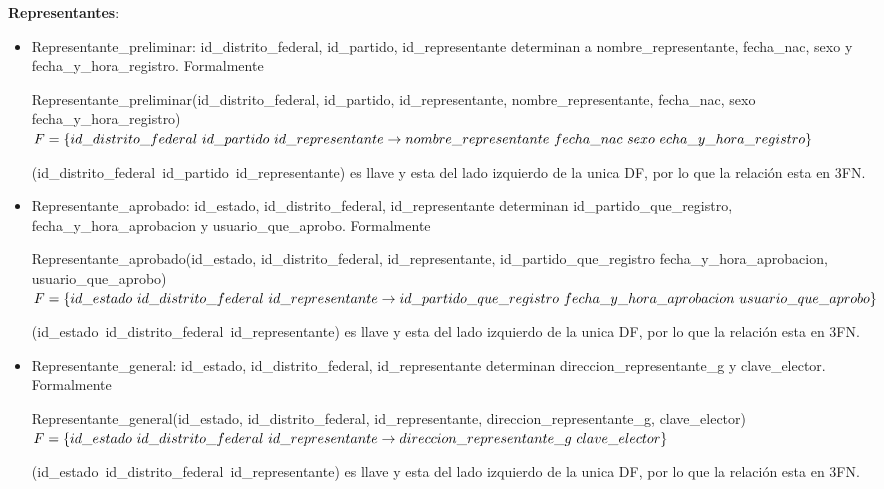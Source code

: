 \documentclass[a4paper,twoside,11pt]{article}
\begin{document}
\textbf{Representantes}:
\begin{itemize}
  \item Representante\_preliminar: id\_distrito\_federal, id\_partido, id\_representante determinan
        a nombre\_representante, fecha\_nac, sexo y fecha\_y\_hora\_registro. Formalmente

        Representante\_preliminar(id\_distrito\_federal, id\_partido, id\_representante,
        nombre\_representante, fecha\_nac, sexo fecha\_y\_hora\_registro)\\
        $F=\{id\_distrito\_federal~id\_partido~id\_representante\rightarrow\\
        nombre\_representante~fecha\_nac~sexo~echa\_y\_hora\_registro\}$

        (id\_distrito\_federal~id\_partido~id\_representante) es llave y esta del lado izquierdo de la unica DF,
        por lo que la relación esta en 3FN.

  \item Representante\_aprobado: id\_estado, id\_distrito\_federal, id\_representante determinan
        id\_partido\_que\_registro, fecha\_y\_hora\_aprobacion y usuario\_que\_aprobo. Formalmente

        Representante\_aprobado(id\_estado, id\_distrito\_federal, id\_representante, id\_partido\_que\_registro
        fecha\_y\_hora\_aprobacion, usuario\_que\_aprobo)\\
        $F=\{id\_estado~id\_distrito\_federal~id\_representante\rightarrow\\
        id\_partido\_que\_registro~fecha\_y\_hora\_aprobacion~usuario\_que\_aprobo\}$

        (id\_estado~id\_distrito\_federal~id\_representante) es llave y esta del lado izquierdo de la unica DF,
        por lo que la relación esta en 3FN.

  \item Representante\_general: id\_estado, id\_distrito\_federal, id\_representante determinan
        direccion\_representante\_g y clave\_elector. Formalmente

        Representante\_general(id\_estado, id\_distrito\_federal, id\_representante,
        direccion\_representante\_g, clave\_elector)\\
        $F=\{id\_estado~id\_distrito\_federal~id\_representante\rightarrow\\
        direccion\_representante\_g~clave\_elector\}$

        (id\_estado~id\_distrito\_federal~id\_representante) es llave y esta del lado izquierdo de la unica DF,
        por lo que la relación esta en 3FN.


\end{itemize}
\end{document}
